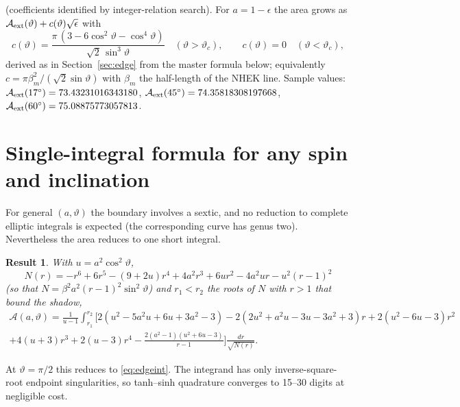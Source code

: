 \documentclass[11pt,a4paper]{article}
\newtheorem{result}{Result}
\theoremstyle{remark}
\numberwithin{equation}{section}
\begin{document}
(coefficients identified by integer-relation search). For $a=1-\epsilon$ the area grows as
$\mathcal A_{\rm ext}(\vartheta)+c(\vartheta)\sqrt\epsilon$ with
\begin{equation}
c(\vartheta)=\frac{\pi\,(3-6\cos^2\vartheta-\cos^4\vartheta)}{\sqrt2\,\sin^3\vartheta}\quad(\vartheta>\vartheta_c),\qquad c(\vartheta)=0\quad(\vartheta<\vartheta_c),
\end{equation}
derived as in Section~\ref{sec:edge} from the master formula below; equivalently $c=\pi\beta_m^2/(\sqrt2\sin\vartheta)$
with $\beta_m$ the half-length of the NHEK line.
Sample values: $\mathcal A_{\rm ext}(17^\circ)=73.43231016343180$, $\mathcal A_{\rm ext}(45^\circ)=74.35818308197668$,
$\mathcal A_{\rm ext}(60^\circ)=75.08875773057813$.

\section{Single-integral formula for any spin and inclination}\label{sec:master}
For general $(a,\vartheta)$ the boundary involves a sextic, and no reduction to complete elliptic integrals is
expected (the corresponding curve has genus two). Nevertheless the area reduces to one short integral.
\begin{result}\label{res:master}
With $u=a^2\cos^2\vartheta$,
\[
N(r)=-r^6+6r^5-(9+2u)r^4+4a^2r^3+6ur^2-4a^2ur-u^2(r-1)^2
\]
(so that $N=\beta^2a^2(r-1)^2\sin^2\vartheta$) and $r_1<r_2$ the roots of $N$ with $r>1$ that bound the shadow,
\begin{multline}
\mathcal A(a,\vartheta)=\frac{1}{u-1}\int_{r_1}^{r_2}\Big[2(u^2-5a^2u+6u+3a^2-3)-2(2u^2+a^2u-3u-3a^2+3)r
+2(u^2-6u-3)r^2\\+4(u+3)r^3+2(u-3)r^4-\frac{2(a^2-1)(u^2+6u-3)}{r-1}\Big]\frac{dr}{\sqrt{N(r)}} .
\label{eq:master}
\end{multline}
\end{result}
At $\vartheta=\pi/2$ this reduces to \eqref{eq:edgeint}. The integrand has only inverse-square-root endpoint
singularities, so tanh--sinh quadrature converges to 15--30 digits at negligible cost.
\end{document}
